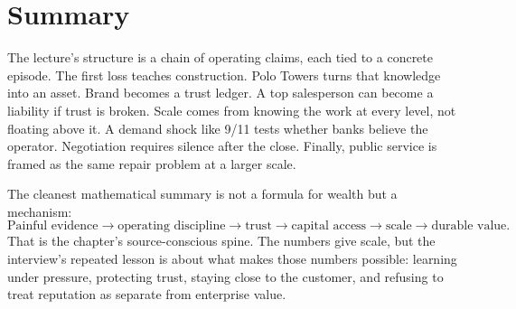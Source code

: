 \section{Summary}

The lecture's structure is a chain of operating claims, each tied to a concrete episode. The first loss teaches construction. Polo Towers turns that knowledge into an asset. Brand becomes a trust ledger. A top salesperson can become a liability if trust is broken. Scale comes from knowing the work at every level, not floating above it. A demand shock like 9/11 tests whether banks believe the operator. Negotiation requires silence after the close. Finally, public service is framed as the same repair problem at a larger scale.

The cleanest mathematical summary is not a formula for wealth but a mechanism:
\begin{equation}
\text{Painful evidence}
\rightarrow
\text{operating discipline}
\rightarrow
\text{trust}
\rightarrow
\text{capital access}
\rightarrow
\text{scale}
\rightarrow
\text{durable value}.
\end{equation}
That is the chapter's source-conscious spine. The numbers give scale, but the interview's repeated lesson is about what makes those numbers possible: learning under pressure, protecting trust, staying close to the customer, and refusing to treat reputation as separate from enterprise value.